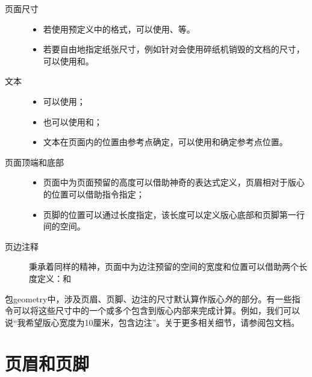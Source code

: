 \begin{description}
    \item[页面尺寸]%
    
\begin{itemize}
    \item 若使用预定义中的格式，可以使用、等。
    \item 若要自由地指定纸张尺寸，例如针对会使用碎纸机销毁的文档的尺寸，可以使用和。
\end{itemize}

\item[文本]

\begin{itemize}
    \item 可以使用；
    \item 也可以使用和；
    \item 文本在页面内的位置由参考点确定，可以使用和确定参考点位置。
\end{itemize}

\item[页面顶端和底部]

\begin{itemize}
    \item 页面中为页面预留的高度可以借助神奇的表达式定义，页眉相对于版心的位置可以借助指令指定；
    \item 页脚的位置可以通过长度指定，该长度可以定义版心底部和页脚第一行间的空间。
\end{itemize}

\item[页边注释] 秉承着同样的精神，页面中为边注预留的空间的宽度和位置可以借助两个长度定义：和
\end{description}

\begin{exclamation}
包geometry中，涉及页眉、页脚、边注的尺寸默认算作版心\emph{外}的部分。有一些指令可以将这些尺寸中的一个或多个包含到版心内部来完成计算。例如，我们可以说``我希望版心宽度为10厘米，包含边注''。关于更多相关细节，请参阅包文档。
\end{exclamation}

\section{页眉和页脚}

